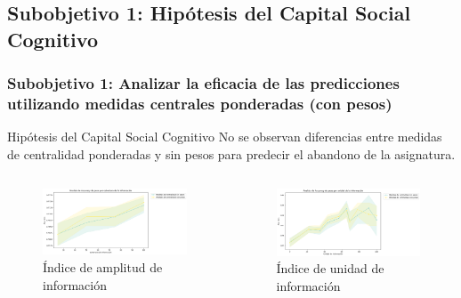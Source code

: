 \documentclass{beamer}
\begin{document}
\subsection{Subobjetivo 1: Hipótesis del Capital Social Cognitivo}
\begin{frame}
	\frametitle{Subobjetivo 1: Analizar la eficacia de las predicciones utilizando medidas centrales ponderadas (con pesos)}
\begin{block}{Hipótesis del Capital Social Cognitivo}
	No se observan diferencias entre medidas de centralidad ponderadas y sin pesos para predecir el abandono de la asignatura.
\end{block}

		\begin{columns}[c]
		\begin{column}{.5\textwidth}
			\begin{figure}
				\centering
				\includegraphics[width=1\textwidth]{figs/cap7/figura_34}
\caption{Índice de amplitud de información}
			\end{figure}      
		\end{column}
		\begin{column}{.5\textwidth}
			\begin{figure}
				\centering
			\includegraphics[width=1\textwidth]{figs/cap7/figura_35}
\caption{Índice de unidad de información}
			\end{figure}
		\end{column}
		\end{columns}
			
\end{frame}
\end{document}
